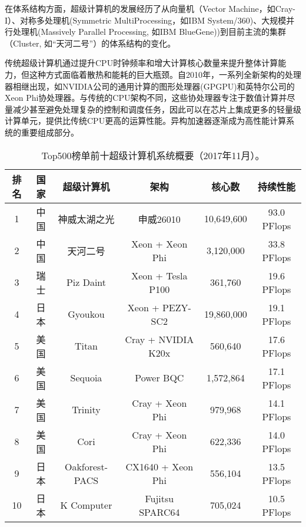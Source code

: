 在体系结构方面，超级计算机的发展经历了从向量机（Vector Machine，如Cray-I\cite{russell1978cray}）、对称多处理机(Symmetric MultiProcessing，如IBM System/360\cite{anderson1967ibm})、大规模并行处理机(Massively Parallel Processing, 如IBM BlueGene\cite{adiga2002overview}))到目前主流的集群（Cluster, 如“天河二号”\cite{tianhe-2}）的体系结构的变化。

传统超级计算机通过提升CPU时钟频率和增大计算核心数量来提升整体计算能力，但这种方式面临着散热和能耗的巨大瓶颈。自2010年，一系列全新架构的处理器相继出现，如NVIDIA公司的通用计算的图形处理器\cite{nvidia2008programming}(GPGPU)和英特尔公司的Xeon Phi协处理器\cite{jeffers2013intel}。与传统的CPU架构不同，这些协处理器专注于数值计算并尽量减少甚至避免处理复杂的控制和调度任务，因此可以在芯片上集成更多的轻量级计算单元，提供比传统CPU更高的运算性能。异构加速器逐渐成为高性能计算系统的重要组成部分。

\begin{table}[ht]
\centering
\caption{Top500榜单前十超级计算机系统概要（2017年11月）。}
\label{tb:top500}
\begin{tabular}{cccccc}
\hline
排名 & 国家 & 超级计算机     & 架构               & 核心数      & 持续性能        \\ \hline
1  & 中国 & 神威太湖之光     & 申威26010          & 10,649,600 & 93.0 PFlops \\ \hline
2  & 中国 & 天河二号        & Xeon + Xeon Phi    & 3,120,000  & 33.8 PFlops \\ \hline
3  & 瑞士 & Piz Daint      & Xeon + Tesla P100  & 361,760    & 19.6 PFlops \\ \hline
4  & 日本 & Gyoukou        & Xeon + PEZY-SC2    & 19,860,000 & 19.1 PFlops \\ \hline
5  & 美国 & Titan          & Cray + NVIDIA K20x & 560,640    & 17.6 PFlops \\ \hline
6  & 美国 & Sequoia        & Power BQC          & 1,572,864  & 17.1 PFlops \\ \hline
7  & 美国 & Trinity        & Cray + Xeon Phi    & 979,968    & 14.1 PFlops \\ \hline
8  & 美国 & Cori           & Cray + Xeon Phi    & 622,336    & 14.0 PFlops \\ \hline
9  & 日本 & Oakforest-PACS & CX1640 + Xeon Phi  & 556,104    & 13.5 PFlops \\ \hline
10 & 日本 & K Computer     & Fujitsu SPARC64     & 705,024    & 10.5 PFlops \\ \hline
\hline
\end{tabular}
\end{table}



